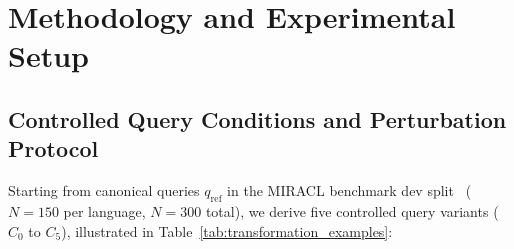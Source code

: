 \documentclass[runningheads]{llncs}
\begin{document}
\section{Methodology and Experimental Setup}
\label{sec:method}

\subsection{Controlled Query Conditions and Perturbation Protocol}
Starting from canonical queries $q_{\text{ref}}$ in the MIRACL benchmark dev split~\cite{zhang2023miracl} ($N=150$ per language, $N=300$ total), we derive five controlled query variants ($C_0$ to $C_5$), illustrated in Table~\ref{tab:transformation_examples}:
\end{document}
